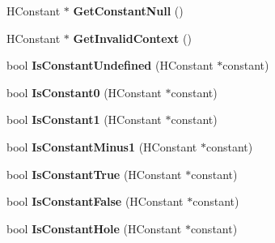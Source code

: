 \begin{DoxyCompactItemize}
\item 
\hypertarget{classv8_1_1internal_1_1_v8___f_i_n_a_l_a4e4fbd265d0abd784efd3fd78ab9dab6}{}H\+Constant $\ast$ {\bfseries Get\+Constant\+Null} ()\label{classv8_1_1internal_1_1_v8___f_i_n_a_l_a4e4fbd265d0abd784efd3fd78ab9dab6}

\item 
\hypertarget{classv8_1_1internal_1_1_v8___f_i_n_a_l_abe75c25accc8e2b708ca70105d48a4ba}{}H\+Constant $\ast$ {\bfseries Get\+Invalid\+Context} ()\label{classv8_1_1internal_1_1_v8___f_i_n_a_l_abe75c25accc8e2b708ca70105d48a4ba}

\item 
\hypertarget{classv8_1_1internal_1_1_v8___f_i_n_a_l_aca8cfaec61c0f39642083b6243cc8b84}{}bool {\bfseries Is\+Constant\+Undefined} (H\+Constant $\ast$constant)\label{classv8_1_1internal_1_1_v8___f_i_n_a_l_aca8cfaec61c0f39642083b6243cc8b84}

\item 
\hypertarget{classv8_1_1internal_1_1_v8___f_i_n_a_l_a26362d95136f288b57869087876c3b44}{}bool {\bfseries Is\+Constant0} (H\+Constant $\ast$constant)\label{classv8_1_1internal_1_1_v8___f_i_n_a_l_a26362d95136f288b57869087876c3b44}

\item 
\hypertarget{classv8_1_1internal_1_1_v8___f_i_n_a_l_a8b3f669f9c60e19d1726654a20418b64}{}bool {\bfseries Is\+Constant1} (H\+Constant $\ast$constant)\label{classv8_1_1internal_1_1_v8___f_i_n_a_l_a8b3f669f9c60e19d1726654a20418b64}

\item 
\hypertarget{classv8_1_1internal_1_1_v8___f_i_n_a_l_ab1038ece5f36192db79ccf0e56742c73}{}bool {\bfseries Is\+Constant\+Minus1} (H\+Constant $\ast$constant)\label{classv8_1_1internal_1_1_v8___f_i_n_a_l_ab1038ece5f36192db79ccf0e56742c73}

\item 
\hypertarget{classv8_1_1internal_1_1_v8___f_i_n_a_l_a7bf48008d975f3d61a272519677ab9e0}{}bool {\bfseries Is\+Constant\+True} (H\+Constant $\ast$constant)\label{classv8_1_1internal_1_1_v8___f_i_n_a_l_a7bf48008d975f3d61a272519677ab9e0}

\item 
\hypertarget{classv8_1_1internal_1_1_v8___f_i_n_a_l_adff1e338520f1245d7dd04f99ee111ca}{}bool {\bfseries Is\+Constant\+False} (H\+Constant $\ast$constant)\label{classv8_1_1internal_1_1_v8___f_i_n_a_l_adff1e338520f1245d7dd04f99ee111ca}

\item 
\hypertarget{classv8_1_1internal_1_1_v8___f_i_n_a_l_a145b1a4244ae889b4769eb19986a63d7}{}bool {\bfseries Is\+Constant\+Hole} (H\+Constant $\ast$constant)\label{classv8_1_1internal_1_1_v8___f_i_n_a_l_a145b1a4244ae889b4769eb19986a63d7}


\end{DoxyCompactItemize}
